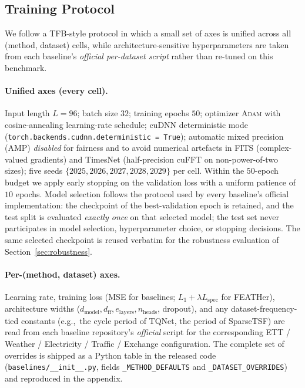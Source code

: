 \documentclass[journal]{IEEEtran}
\theoremstyle{remark}
\begin{document}
\subsection{Training Protocol}
\label{subsec:protocol}

We follow a TFB-style protocol in which a small set of axes is
unified across all (method, dataset) cells, while
architecture-sensitive hyperparameters are taken from each baseline's
\emph{official per-dataset script} rather than re-tuned on this
benchmark.

\paragraph{Unified axes (every cell).} Input length $L = 96$;
batch size $32$; training epochs $50$; optimizer
\textsc{Adam} with cosine-annealing learning-rate schedule; cuDNN
deterministic mode (\texttt{torch.backends.cudnn.deterministic =
True}); automatic mixed precision (AMP) \emph{disabled} for fairness
and to avoid numerical artefacts in FITS (complex-valued gradients)
and TimesNet (half-precision cuFFT on non-power-of-two sizes); five
seeds $\{2025, 2026, 2027, 2028, 2029\}$ per cell.
Within the $50$-epoch budget we apply early stopping on the
validation loss with a uniform patience of $10$ epochs. Model
selection follows the protocol used by every baseline's official
implementation: the checkpoint of the best-validation epoch is
retained, and the test split is evaluated \emph{exactly once} on
that selected model; the test set never participates in model
selection, hyperparameter choice, or stopping decisions. The same
selected checkpoint is reused verbatim for the robustness
evaluation of Section~\ref{sec:robustness}.

\paragraph{Per-(method, dataset) axes.}
Learning rate, training loss (MSE for baselines; $L_1 + \lambda
L_{\mathrm{spec}}$ for FEATHer), architecture widths
($d_{\mathrm{model}}, d_{\mathrm{ff}}, e_{\mathrm{layers}},
n_{\mathrm{heads}}$, dropout), and any dataset-frequency-tied
constants (e.g.,~the cycle period of TQNet, the period of SparseTSF)
are read from each baseline repository's \textit{official} script
for the corresponding ETT / Weather / Electricity / Traffic / Exchange
configuration. The complete set of overrides is shipped as a Python
table in the released code (\texttt{baselines/\_\_init\_\_.py},
fields \texttt{\_METHOD\_DEFAULTS} and \texttt{\_DATASET\_OVERRIDES})
and reproduced in the appendix.
\end{document}
